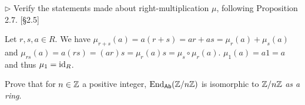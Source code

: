 \begin{problem}
	$\triangleright$ Verify the statements made about right-multiplication $\mu$, following Proposition 2.7. [\S 2.5]
\end{problem}

\begin{solution}
	Let $r, s, a \in R$. We have $\mu_{r+s}(a) = a(r+s) = ar+as = \mu_r(a) + \mu_s(a)$ and $\mu_{rs}(a) = a(rs) = (ar)s = \mu_r(a)s = \mu_s \circ \mu_r(a)$. $\mu_1(a) = a1 = a$ and thus $\mu_1 = \mathrm{id}_R$.
\end{solution}

\begin{problem}
	Prove that for $n \in \mathbb{Z}$ a positive integer, $\mathrm{End}_{\mathsf{Ab}}(\mathbb{Z}/n\mathbb{Z})$ is isomorphic to $\mathbb{Z}/n\mathbb{Z}$ \emph{as a ring}.
\end{problem}

